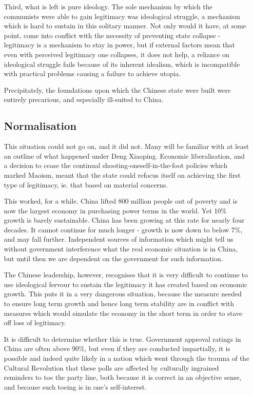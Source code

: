 	Third, what is left is pure ideology. The sole mechanism by which the communists were able to gain legitimacy was ideological struggle, a mechanism which is hard to sustain in this solitary manner. Not only would it have, at some point, come into conflict with the necessity of preventing state collapse - legitimacy is a mechanism to stay in power, but if external factors mean that even with perceived legitimacy one collapses, it does not help, a reliance on ideological struggle fails because of its inherent idealism, which is incompatible with practical problems causing a failure to achieve utopia.

	Precipitately, the foundations upon which the Chinese state were built were entirely precarious, and especially ill-suited to China.


\subsection{Normalisation}


	This situation could not go on, and it did not. Many will be familiar with at least an outline of what happened under Deng Xiaoping. Economic liberalisation, and a decision to cease the continual shooting-oneself-in-the-foot policies which marked Maoism, meant that the state could refocus itself on achieving the first type of legitimacy, ie. that based on material concerns.

	This worked, for a while. China lifted 800 million people out of poverty and is now the largest economy in purchasing power terms in the world. Yet 10\% growth is barely sustainable. China has been growing at this rate for nearly four decades. It cannot continue for much longer - growth is now down to below 7\%, and may fall further. Independent sources of information which might tell us without government interference what the real economic situation is in China, but until then we are dependent on the government for such information.

	The Chinese leadership, however, recognises that it is very difficult to continue to use ideological fervour to sustain the legitimacy it has created based on economic growth. This puts it in a very dangerous situation, because the measure needed to ensure long term growth and hence long term stability are in conflict with measures which would simulate the economy in the short term in order to stave off loss of legitimacy.

	It is difficult to determine whether this is true. Government approval ratings in China are often above 90\%, but even if they are conducted impartially, it is possible and indeed quite likely in a nation which went through the trauma of the Cultural Revolution that these polls are affected by culturally ingrained reminders to toe the party line, both because it is correct in an objective sense, and because such toeing is in one's self-interest.

